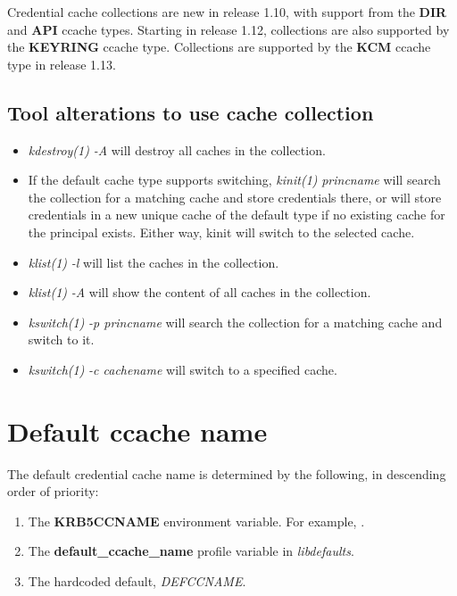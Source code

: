\documentclass[letterpaper,10pt,english]{sphinxmanual}
\begin{document}
Credential cache collections are new in release 1.10, with support
from the \textbf{DIR} and \textbf{API} ccache types.  Starting in release 1.12,
collections are also supported by the \textbf{KEYRING} ccache type.
Collections are supported by the \textbf{KCM} ccache type in release 1.13.


\subsection{Tool alterations to use cache collection}
\label{basic/ccache_def:tool-alterations-to-use-cache-collection}\begin{itemize}
\item {} 
\emph{kdestroy(1)} \emph{-A} will destroy all caches in the collection.

\item {} 
If the default cache type supports switching, \emph{kinit(1)}
\emph{princname} will search the collection for a matching cache and
store credentials there, or will store credentials in a new unique
cache of the default type if no existing cache for the principal
exists.  Either way, kinit will switch to the selected cache.

\item {} 
\emph{klist(1)} \emph{-l} will list the caches in the collection.

\item {} 
\emph{klist(1)} \emph{-A} will show the content of all caches in the
collection.

\item {} 
\emph{kswitch(1)} \emph{-p princname} will search the collection for a
matching cache and switch to it.

\item {} 
\emph{kswitch(1)} \emph{-c cachename} will switch to a specified cache.

\end{itemize}


\section{Default ccache name}
\label{basic/ccache_def:default-ccache-name}
The default credential cache name is determined by the following, in
descending order of priority:
\begin{enumerate}
\item {} 
The \textbf{KRB5CCNAME} environment variable.  For example,
.

\item {} 
The \textbf{default\_ccache\_name} profile variable in \emph{libdefaults}.

\item {} 
The hardcoded default, \emph{DEFCCNAME}.

\end{enumerate}
\end{document}
